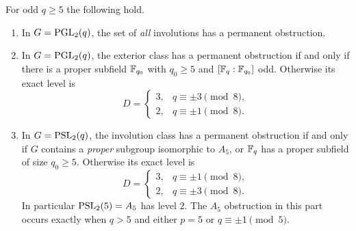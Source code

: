 \begin{theorem}
\label{thm:rankone-classification}
For odd $q\ge5$ the following hold.
\begin{enumerate}[nosep,leftmargin=1.6em]
\item In $G=\operatorname{PGL}_2(q)$, the set of \emph{all} involutions has a
permanent obstruction.
\item In $G=\operatorname{PGL}_2(q)$, the exterior class has a permanent obstruction if and
only if there is a proper subfield $\mathbb{F}_{q_0}$ with $q_0\ge5$ and
$[\mathbb{F}_q:\mathbb{F}_{q_0}]$ odd. Otherwise its exact level is
\[
D=\begin{cases}3,&q\equiv\pm3\pmod8,\\2,&q\equiv\pm1\pmod8.\end{cases}
\]
\item In $G=\operatorname{PSL}_2(q)$, the involution class has a permanent obstruction if
and only if $G$ contains a \emph{proper} subgroup isomorphic to $A_5$, or
$\mathbb{F}_q$ has a proper subfield of size $q_0\ge5$. Otherwise its exact level is
\[
D=\begin{cases}3,&q\equiv\pm1\pmod8,\\2,&q\equiv\pm3\pmod8.\end{cases}
\]
In particular $\operatorname{PSL}_2(5)=A_5$ has level $2$. The $A_5$ obstruction in this
part occurs exactly when $q>5$ and either $p=5$ or $q\equiv\pm1\pmod5$.
\end{enumerate}
\end{theorem}
